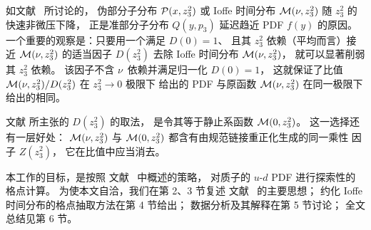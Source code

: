 {如文献~\cite{Radyushkin:2016hsy,Radyushkin:2017gjd} 所讨论的，
伪部分子分布 $ {\cal P} (x, z_3^2) $ 或 Ioffe 时间分布
${\cal M} (\nu, z_3^2)$ 随 $z_3^2$ 的快速非微压下降，
正是准部分子分布 $Q(y, p_3)$ 延迟趋近 PDF $f(y)$ 的原因。}
一个重要的观察是：只要用一个满足 $D(0)=1$、
且其 $z_3^2$ 依赖（平均而言）接近 ${\cal M} (\nu, z_3^2)$ 的适当因子
$D(z_3^2)$ 去除 Ioffe 时间分布 ${\cal M} (\nu, z_3^2)$，
就可以显著削弱其 $z_3^2$ 依赖。
该因子不含 \mbox{$\nu$ 依赖}并满足归一化 $D(0)=1$，
这就保证了比值 ${\cal M} (\nu, z_3^2)/D(z_3^2)$ 在 $z_3^2 \to 0$ 极限下
给出的 PDF 与原函数 ${\cal M} (\nu, z_3^2)$ 在同一极限下给出的相同。


文献 \cite{Radyushkin:2017cyf} 所主张的 $D(z_3^2)$ 的取法，
是令其等于静止系函数 $ {\cal M} (0, z_3^2)$。
这一选择还有一层好处：
${\cal M} (\nu, z_3^2)$ 与 ${\cal M} (0, z_3^2)$ 都含有由规范链接重正化生成的同一乘性
因子 $Z(z_3^2)$，
它在比值中应当消去。

本工作的目标，是按照 \mbox{文献~\cite{Radyushkin:2017cyf}} 中概述的策略，
对质子的 $u$-$d$ PDF 进行探索性的格点计算。
为使本文自洽，我们在第 2、3 节复述
\mbox{文献~\cite{Radyushkin:2017cyf}} 的主要思想；
约化 Ioffe 时间分布的格点抽取方法在第 4 节给出；
数据分析及其解释在第 5 节讨论；
全文总结见第 6 节。
